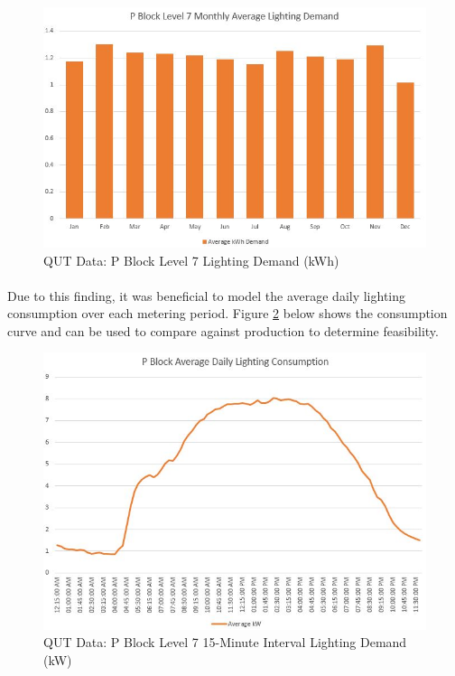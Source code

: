 \begin{figure}[H]
	\hfill\includegraphics[width = 150mm]{images/metering/pme/pblock-lvl7-monthly-kwh}\hspace*{\fill}
	\caption{QUT Data: P Block Level 7 Lighting Demand (kWh)} 
	\label{fig:pblock-lvl7-monthly-kwh}
\end{figure} 

\paragraph{}
Due to this finding, it was beneficial to model the average daily lighting consumption over each metering period. Figure \ref{fig:pblock-lvl7-15-minute} below shows the consumption curve and can be used to compare against production to determine feasibility.  

\begin{figure}[H]
	\hfill\includegraphics[width = 150mm]{images/metering/pme/pblock-lvl7-daily-avg-kw}\hspace*{\fill}
	\caption{QUT Data: P Block Level 7 15-Minute Interval Lighting Demand (kW)} 
	\label{fig:pblock-lvl7-15-minute}
\end{figure}

